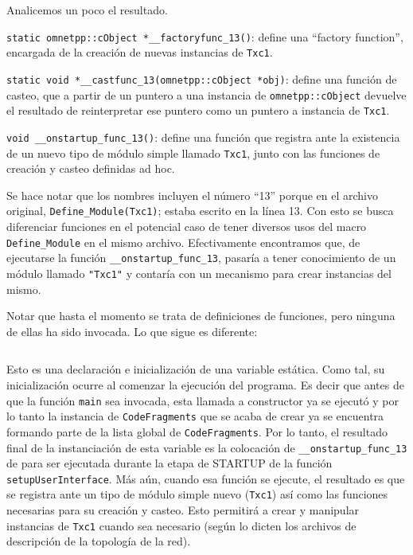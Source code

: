 \inputminted{c++}{codelistings/define_module_3.cc}

Analicemos un poco el resultado.

\verb!static omnetpp::cObject *__factoryfunc_13()!: define una ``factory
function'', encargada de la creación de nuevas instancias de \verb!Txc1!.

\verb!static void *__castfunc_13(omnetpp::cObject *obj)!: define una función de
casteo, que a partir de un puntero a una instancia de \verb!omnetpp::cObject!
devuelve el resultado de reinterpretar ese puntero como un puntero a instancia
de \verb!Txc1!.

\verb!void __onstartup_func_13()!: define una función que registra ante \omnetpp{}
la existencia de un nuevo tipo de módulo simple llamado \verb!Txc1!, junto con
las funciones de creación y casteo definidas ad hoc.

Se hace notar que los nombres incluyen el número ``13'' porque en el archivo
original, \verb!Define_Module(Txc1)!; estaba escrito en la línea 13. Con esto
se busca diferenciar funciones en el potencial caso de tener diversos usos del
macro \verb!Define_Module! en el mismo archivo. Efectivamente encontramos que,
de ejecutarse la función \verb!__onstartup_func_13!, \omnetpp{} pasaría a tener
conocimiento de un módulo llamado \verb!"Txc1"! y contaría con un mecanismo
para crear instancias del mismo.

Notar que hasta el momento se trata de definiciones de funciones, pero ninguna
de ellas ha sido invocada. Lo que sigue es diferente:

\inputminted{c++}{codelistings/define_module_4.cc}

Esto es una declaración e inicialización de una variable estática. Como
tal, su inicialización ocurre al comenzar la ejecución del programa. Es decir
que antes de que la función \verb!main! sea invocada, esta llamada a
constructor ya se ejecutó y por lo tanto la instancia de \verb!CodeFragments!
que se acaba de crear ya se encuentra formando parte de la lista global de
\verb!CodeFragments!. Por lo tanto, el resultado final de la instanciación de
esta variable es la colocación de \verb!__onstartup_func_13!  de para ser
ejecutada durante la etapa de STARTUP de la función \verb!setupUserInterface!.
Más aún, cuando esa función se ejecute, el resultado es que se registra ante
\omnetpp{} un tipo de módulo simple nuevo (\verb!Txc1!) así como las funciones
necesarias para su creación y casteo. Esto permitirá a \omnetpp{} crear y
manipular instancias de \verb!Txc1!  cuando sea necesario (según lo dicten los
archivos de descripción de la topología de la red).

